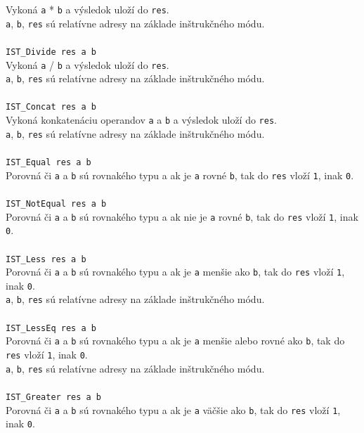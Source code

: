 \documentclass[12pt,a4paper,titlepage,final]{article}
\begin{document}
Vykoná \texttt{a} * \texttt{b} a výsledok uloží do \texttt{res}.\\
\texttt{a}, \texttt{b}, \texttt{res} sú relatívne adresy na základe inštrukčného módu.\\
\\\texttt{IST\_Divide res a b}\\
Vykoná \texttt{a} / \texttt{b} a výsledok uloží do \texttt{res}.\\
\texttt{a}, \texttt{b}, \texttt{res} sú relatívne adresy na základe inštrukčného módu.\\
\\\texttt{IST\_Concat res a b}\\
Vykoná konkatenáciu operandov \texttt{a} a \texttt{b} a výsledok uloží do \texttt{res}.\\
\texttt{a}, \texttt{b}, \texttt{res} sú relatívne adresy na základe inštrukčného módu.\\
\\\texttt{IST\_Equal res a b}\\
Porovná či \texttt{a} a \texttt{b} sú rovnakého typu a ak je \texttt{a} rovné \texttt{b}, tak do \texttt{res} vloží \texttt{1}, inak \texttt{0}.\\
\\\texttt{IST\_NotEqual res a b}\\
Porovná či \texttt{a} a \texttt{b} sú rovnakého typu a ak nie je \texttt{a} rovné \texttt{b}, tak do \texttt{res} vloží \texttt{1}, inak \texttt{0}.\\
\\\texttt{IST\_Less res a b}\\
Porovná či \texttt{a} a \texttt{b} sú rovnakého typu a ak je \texttt{a} menšie ako \texttt{b}, tak do \texttt{res} vloží \texttt{1}, inak \texttt{0}.\\
\texttt{a}, \texttt{b}, \texttt{res} sú relatívne adresy na základe inštrukčného módu.\\
\\\texttt{IST\_LessEq res a b}\\
Porovná či \texttt{a} a \texttt{b} sú rovnakého typu a ak je \texttt{a} menšie alebo rovné ako \texttt{b}, tak do \texttt{res} vloží \texttt{1}, inak \texttt{0}.\\
\texttt{a}, \texttt{b}, \texttt{res} sú relatívne adresy na základe inštrukčného módu.\\
\\\texttt{IST\_Greater res a b}\\
Porovná či \texttt{a} a \texttt{b} sú rovnakého typu a ak je \texttt{a} väčšie ako \texttt{b}, tak do \texttt{res} vloží \texttt{1}, inak \texttt{0}.\\
\end{document}
